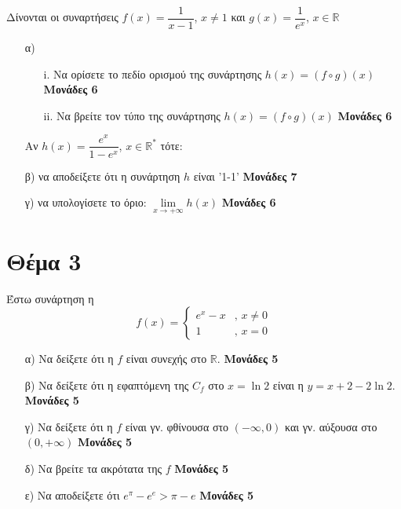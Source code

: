 \documentclass[12pt]{extarticle}
\begin{document}
Δίνονται οι συναρτήσεις $f(x)=\dfrac{1}{x-1}$, $x\ne 1$ και $g(x)=\dfrac{1}{e^x}$, $x\in \mathbb{R}$
\begin{enumerate}
  \item[α)] \begin{enumerate}
      \item[i.] Να ορίσετε το πεδίο ορισμού της συνάρτησης $h(x)=(f\circ g)(x)$ \hspace*{\fill} \textbf{Μονάδες 6}
      \item[ii.] Να βρείτε τον τύπο της συνάρτησης $h(x)=(f\circ g)(x)$ \hspace*{\fill} \textbf{Μονάδες 6}
    \end{enumerate}

    Αν $h(x)=\dfrac{e^x}{1-e^x}$, $x\in \mathbb{R}^*$ τότε:
  \item[β)] να αποδείξετε ότι η συνάρτηση $h$ είναι '1-1' \hspace*{\fill} \textbf{Μονάδες 7}
  \item[γ)] να υπολογίσετε το όριο: $\lim\limits_{x \to +\infty}{ h(x) }$ \hspace*{\fill} \textbf{Μονάδες 6}
\end{enumerate}
\newpage

\section*{Θέμα 3}
\noindent

Έστω συνάρτηση η $$f(x)=\begin{cases} e^x-x & \text{, } x \ne 0 \\ 1 & \text{, } x = 0  \end{cases}$$
\begin{enumerate}
  \item[α)] Να δείξετε ότι η $f$ είναι συνεχής στο $\mathbb{R}$.\hspace*{\fill} \textbf{Μονάδες 5}
  \item[β)] Να δείξετε ότι η εφαπτόμενη της $C_f$ στο $x=\ln2$ είναι η $y=x+2-2\ln2$.\hspace*{\fill} \textbf{Μονάδες 5}
  \item[γ)] Να δείξετε ότι η $f$ είναι γν. φθίνουσα στο $\left(-\infty,0\right)$ και γν. αύξουσα στο $\left(0,+\infty\right)$\hspace*{\fill} \textbf{Μονάδες 5}
  \item[δ)] Να βρείτε τα ακρότατα της $f$\hspace*{\fill} \textbf{Μονάδες 5}
  \item[ε)] Να αποδείξετε ότι $e^{\pi}-e^e > \pi-e$\hspace*{\fill} \textbf{Μονάδες 5}
\end{enumerate}
\end{document}
